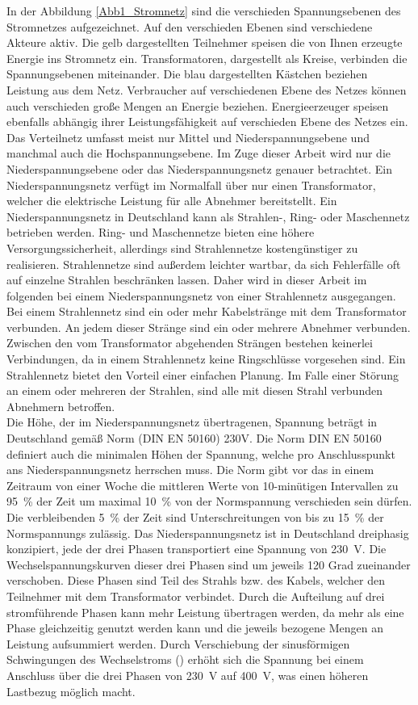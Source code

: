 In der Abbildung \ref{Abb1_Stromnetz}\cite{wagner_2017} sind die verschieden Spannungsebenen des Stromnetzes aufgezeichnet. Auf den verschieden Ebenen sind verschiedene Akteure aktiv. Die gelb dargestellten Teilnehmer speisen die von Ihnen erzeugte Energie ins Stromnetz ein. Transformatoren, dargestellt als Kreise, verbinden die Spannungsebenen miteinander. Die blau dargestellten Kästchen beziehen Leistung aus dem Netz. Verbraucher auf verschiedenen Ebene des Netzes können auch verschieden große Mengen an Energie beziehen. Energieerzeuger speisen ebenfalls abhängig ihrer Leistungsfähigkeit auf verschieden Ebene des Netzes ein. Das Verteilnetz umfasst meist nur Mittel und Niederspannungsebene und manchmal auch die Hochspannungsebene. Im Zuge dieser Arbeit wird nur die Niederspannungsebene oder das Niederspannungsnetz genauer betrachtet. Ein Niederspannungsnetz verfügt im Normalfall über nur einen Transformator, welcher die elektrische Leistung für alle Abnehmer bereitstellt. Ein Niederspannungsnetz in Deutschland kann als Strahlen-, Ring- oder Maschennetz betrieben werden. Ring- und Maschennetze bieten eine höhere Versorgungssicherheit, allerdings sind Strahlennetze kostengünstiger zu realisieren. Strahlennetze sind außerdem leichter wartbar, da sich Fehlerfälle oft auf einzelne Strahlen beschränken lassen. Daher wird in dieser Arbeit im folgenden bei einem Niederspannungsnetz von einer Strahlennetz ausgegangen. Bei einem Strahlennetz sind ein oder mehr Kabelstränge mit dem Transformator verbunden. An jedem dieser Stränge sind ein oder mehrere Abnehmer verbunden. Zwischen den vom Transformator abgehenden Strängen bestehen keinerlei Verbindungen, da in einem Strahlennetz keine Ringschlüsse vorgesehen sind. Ein Strahlennetz bietet den Vorteil einer einfachen Planung. Im Falle einer Störung an einem oder mehreren der Strahlen, sind alle mit diesen Strahl verbunden Abnehmern betroffen.\\
Die Höhe, der im Niederspannungsnetz übertragenen, Spannung beträgt in Deutschland gemäß Norm (DIN EN 50160) 230V. Die Norm DIN EN 50160 definiert auch die minimalen Höhen der Spannung, welche pro Anschlusspunkt ans Niederspannungsnetz herrschen muss. Die Norm gibt vor das in einem Zeitraum von einer Woche die mittleren Werte von 10-minütigen Intervallen zu 95~\% der Zeit um maximal 10~\% von der Normspannung verschieden sein dürfen. Die verbleibenden 5~\% der Zeit sind Unterschreitungen von bis zu 15~\% der Normspannungs zulässig. Das Niederspannungsnetz ist in Deutschland dreiphasig konzipiert, jede der drei Phasen transportiert eine Spannung von 230~V. Die Wechselspannungskurven dieser drei Phasen sind um jeweils 120 Grad zueinander verschoben. Diese Phasen sind Teil des Strahls bzw. des Kabels, welcher den Teilnehmer mit dem Transformator verbindet. Durch die Aufteilung auf drei stromführende Phasen kann mehr Leistung übertragen werden, da mehr als eine Phase  gleichzeitig genutzt werden kann und die jeweils bezogene Mengen an Leistung aufsummiert werden. Durch Verschiebung der sinusförmigen Schwingungen des Wechselstroms (\cite{strom_phasen}) erhöht sich die Spannung bei einem Anschluss über die drei Phasen von 230~V auf 400~V, was einen höheren Lastbezug möglich macht.



